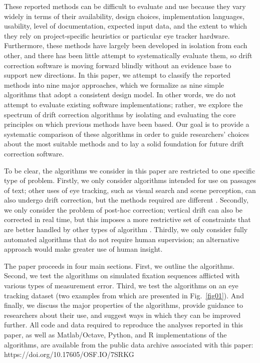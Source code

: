 \documentclass[doc,biblatex]{apa7}
\begin{document}
These reported methods can be difficult to evaluate and use because they vary widely in terms of their availability, design choices, implementation languages, usability, level of documentation, expected input data, and the extent to which they rely on project-specific heuristics or particular eye tracker hardware. Furthermore, these methods have largely been developed in isolation from each other, and there has been little attempt to systematically evaluate them, so drift correction software is moving forward blindly without an evidence base to support new directions. In this paper, we attempt to classify the reported methods into nine major approaches, which we formalize as nine simple algorithms that adopt a consistent design model. In other words, we do not attempt to evaluate existing software implementations; rather, we explore the spectrum of drift correction algorithms by isolating and evaluating the core principles on which previous methods have been based. Our goal is to provide a systematic comparison of these algorithms in order to guide researchers' choices about the most suitable methods and to lay a solid foundation for future drift correction software.

To be clear, the algorithms we consider in this paper are restricted to one specific type of problem. Firstly, we only consider algorithms intended for use on passages of text; other uses of eye tracking, such as visual search and scene perception, can also undergo drift correction, but the methods required are different \parencite[see e.g.,][]{Zhang:2011,Zhang:2014}. Secondly, we only consider the problem of post-hoc correction; vertical drift can also be corrected in real time, but this imposes a more restrictive set of constraints that are better handled by other types of algorithm \parencite[see e.g.,][]{Hyrskykari:2006,Palmer:2016}. Thirdly, we only consider fully automated algorithms that do not require human supervision; an alternative approach would make greater use of human insight.

The paper proceeds in four main sections. First, we outline the algorithms. Second, we test the algorithms on simulated fixation sequences afflicted with various types of measurement error. Third, we test the algorithms on an eye tracking dataset (two examples from which are presented in Fig.~\ref{fig01}). And finally, we discuss the major properties of the algorithms, provide guidance to researchers about their use, and suggest ways in which they can be improved further. All code and data required to reproduce the analyses reported in this paper, as well as Matlab/Octave, Python, and R implementations of the algorithms, are available from the public data archive associated with this paper: https://doi.org/10.17605/OSF.IO/7SRKG
\end{document}
